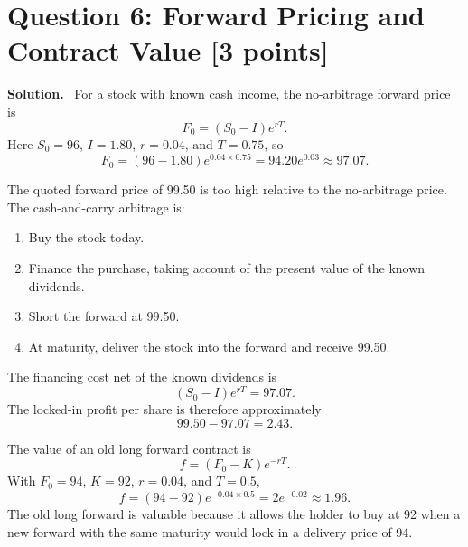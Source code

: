\documentclass[11pt]{article}
\newcommand{\pts}[1]{\hspace{0.35em}\textnormal{\textbf{[#1 points]}}}
\newcommand{\Fzero}{F_0}
\newcommand{\K}{K}
\newenvironment{solution}{\par\noindent\textbf{Solution.}\ }{\par}
\begin{document}
\section*{Question 6: Forward Pricing and Contract Value \pts{3}}

\begin{solution}
For a stock with known cash income, the no-arbitrage forward price is
\[
    \Fzero=(S_0-I)e^{rT}.
\]
Here $S_0=96$, $I=1.80$, $r=0.04$, and $T=0.75$, so
\[
    \Fzero=(96-1.80)e^{0.04\times 0.75}
    =94.20e^{0.03}
    \approx 97.07.
\]

The quoted forward price of 99.50 is too high relative to the no-arbitrage
price. The cash-and-carry arbitrage is:
\begin{enumerate}
    \item Buy the stock today.
    \item Finance the purchase, taking account of the present value of the known
    dividends.
    \item Short the forward at 99.50.
    \item At maturity, deliver the stock into the forward and receive 99.50.
\end{enumerate}
The financing cost net of the known dividends is
\[
    (S_0-I)e^{rT}=97.07.
\]
The locked-in profit per share is therefore approximately
\[
    99.50-97.07=2.43.
\]

The value of an old long forward contract is
\[
    f=(\Fzero-\K)e^{-rT}.
\]
With $\Fzero=94$, $\K=92$, $r=0.04$, and $T=0.5$,
\[
    f=(94-92)e^{-0.04\times 0.5}
    =2e^{-0.02}
    \approx 1.96.
\]
The old long forward is valuable because it allows the holder to buy at 92 when
a new forward with the same maturity would lock in a delivery price of 94.
\end{solution}
\end{document}

